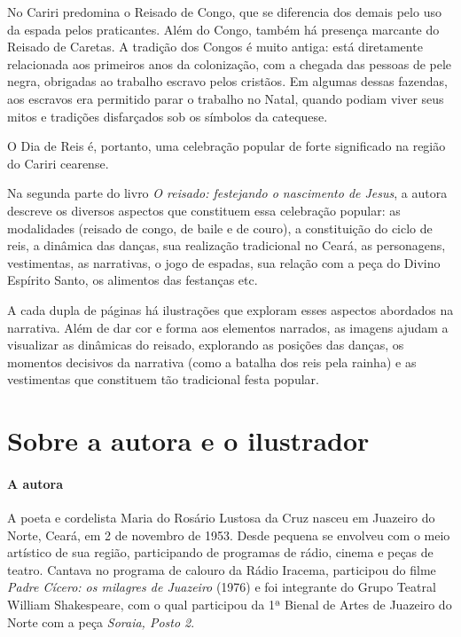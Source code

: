 \documentclass[11pt]{extarticle}
\begin{document}
No Cariri predomina o Reisado de Congo, que se diferencia dos demais pelo uso da espada pelos praticantes. Além do Congo, também há presença marcante do Reisado de Caretas. A tradição dos Congos é muito antiga: está diretamente relacionada aos primeiros anos da colonização, com a chegada das pessoas de pele negra, obrigadas ao trabalho escravo pelos cristãos. Em algumas dessas fazendas, aos escravos era permitido parar o trabalho no Natal, quando podiam viver seus mitos e tradições disfarçados sob os símbolos da catequese.

O Dia de Reis é, portanto, uma celebração popular de forte significado na região do Cariri cearense. 

Na segunda parte do livro  \textit{O reisado: festejando o nascimento de Jesus}, a autora descreve os diversos aspectos que constituem essa celebração popular: as modalidades (reisado de congo, de baile e de couro), a constituição do ciclo de reis, a dinâmica das danças, sua realização tradicional no Ceará, as personagens, vestimentas, as narrativas, o jogo de espadas, sua relação com a peça do Divino Espírito Santo, os alimentos das festanças etc.

A cada dupla de páginas há ilustrações que exploram esses aspectos abordados na narrativa. Além de dar cor e forma aos elementos narrados, as imagens ajudam a visualizar as dinâmicas do reisado, explorando as posições das danças, os momentos decisivos da narrativa (como a batalha dos reis pela rainha) e as vestimentas que constituem tão tradicional festa popular.


\section{Sobre a autora e o ilustrador}


\paragraph{A autora}
A poeta e cordelista Maria do Rosário Lustosa da Cruz nasceu em Juazeiro do Norte, Ceará, em 2 de novembro de 1953. Desde pequena se envolveu com o meio artístico de sua região, participando de programas de rádio, cinema e peças de teatro. Cantava no programa de calouro da Rádio Iracema, participou do filme \textit{Padre Cícero: os milagres de Juazeiro} (1976) e foi integrante do Grupo Teatral William Shakespeare, com o qual participou da 1ª Bienal de Artes de Juazeiro do Norte com a peça \textit{Soraia, Posto 2}.
\end{document}

